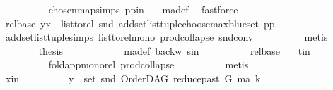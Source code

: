 \begin{isabellebody}
\ \ \ \ \ \ \ \ \isamarkupfalse%
\ chosen{\isacharunderscore}{\kern0pt}map{\isacharunderscore}{\kern0pt}simps{\isacharparenleft}{\kern0pt}{}{\isacharparenright}{\kern0pt}\ pp{\isacharunderscore}{\kern0pt}in\ {}\ \isamarkupfalse%
\ ma{\isacharunderscore}{\kern0pt}def\ \isamarkupfalse%
\ fastforce\isanewline
\ \ \ \ \ \ \isamarkupfalse%
\ \isamarkupfalse%
\ rel{\isacharunderscore}{\kern0pt}base{\isacharcolon}{\kern0pt}\ {\isachardoublequoteopen}{\isacharparenleft}{\kern0pt}y{\isacharcomma}{\kern0pt}x{\isacharparenright}{\kern0pt}\ {\isasymin}\ list{\isacharunderscore}{\kern0pt}to{\isacharunderscore}{\kern0pt}rel\ {\isacharparenleft}{\kern0pt}snd\ {\isacharparenleft}{\kern0pt}add{\isacharunderscore}{\kern0pt}set{\isacharunderscore}{\kern0pt}list{\isacharunderscore}{\kern0pt}tuple{\isacharparenleft}{\kern0pt}choose{\isacharunderscore}{\kern0pt}max{\isacharunderscore}{\kern0pt}blue{\isacharunderscore}{\kern0pt}set\ pp{\isacharparenright}{\kern0pt}{\isacharparenright}{\kern0pt}{\isacharparenright}{\kern0pt}{\isachardoublequoteclose}\isanewline
\ \ \ \ \ \ \ \ \isamarkupfalse%
\ add{\isacharunderscore}{\kern0pt}set{\isacharunderscore}{\kern0pt}list{\isacharunderscore}{\kern0pt}tuple{\isachardot}{\kern0pt}simps\ list{\isacharunderscore}{\kern0pt}to{\isacharunderscore}{\kern0pt}rel{\isacharunderscore}{\kern0pt}mono\ prod{\isachardot}{\kern0pt}collapse\ snd{\isacharunderscore}{\kern0pt}conv\isanewline
\ \ \ \ \ \ \ \ \isamarkupfalse%
\ metis\ \isanewline
\isanewline
\ \ \ \ \ \ \isamarkupfalse%
\ {\isacharquery}{\kern0pt}thesis\ \isanewline
\ \ \ \ \ \ \ \ \isamarkupfalse%
\ \ ma{\isacharunderscore}{\kern0pt}def\ backw\ s{\isacharunderscore}{\kern0pt}in\isanewline
\ \ \ \ \ \ \ \ \isamarkupfalse%
\ rel{\isacharunderscore}{\kern0pt}base\ \ \isamarkupfalse%
\ t{\isacharunderscore}{\kern0pt}in\ \isanewline
\ \ \ \ \ \ \ \ \isamarkupfalse%
\ fold{\isacharunderscore}{\kern0pt}app{\isacharunderscore}{\kern0pt}mono{\isacharunderscore}{\kern0pt}rel\ prod{\isachardot}{\kern0pt}collapse\isanewline
\ \ \ \ \ \ \ \ \isamarkupfalse%
\ metis\ \ \ \ \ \ \ \isanewline
\ \ \ \ \isamarkupfalse%
\isanewline
\ \ \ \ \ \ \isamarkupfalse%
\ x{\isacharunderscore}{\kern0pt}in\isanewline
\ \ \ \ \ \ \isamarkupfalse%
\ \isamarkupfalse%
\ {\isachardoublequoteopen}y\ {\isasymin}\ set\ {\isacharparenleft}{\kern0pt}snd\ {\isacharparenleft}{\kern0pt}OrderDAG\ {\isacharparenleft}{\kern0pt}reduce{\isacharunderscore}{\kern0pt}past\ G\ ma{\isacharparenright}{\kern0pt}\ k{\isacharparenright}{\kern0pt}{\isacharparenright}{\kern0pt}{\isachardoublequoteclose}\isanewline

\end{isabellebody}
